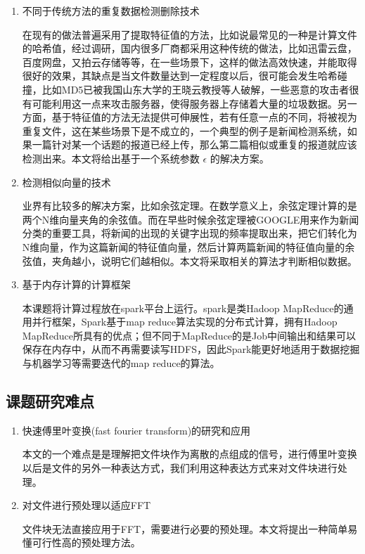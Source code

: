 \begin{enumerate}
\item 不同于传统方法的重复数据检测删除技术

在现有的做法普遍采用了提取特征值的方法，比如说最常见的一种是计算文件的哈希值，经过调研，国内很多厂商都采用这种传统的做法，比如迅雷云盘，百度网盘，又拍云存储等等，在一些场景下，这样的做法高效快速，并能取得很好的效果，其缺点是当文件数量达到一定程度以后，很可能会发生哈希碰撞，比如MD5已被我国山东大学的王晓云教授等人破解，一些恶意的攻击者很有可能利用这一点来攻击服务器，使得服务器上存储着大量的垃圾数据。另一方面，基于特征值的方法无法提供可伸展性，若有任意一点的不同，将被视为重复文件，这在某些场景下是不成立的，一个典型的例子是新闻检测系统，如果一篇针对某一个话题的报道已经上传，那么第二篇相似或重复的报道就应该检测出来。本文将给出基于一个系统参数 $\epsilon$ 的解决方案。

\item 检测相似向量的技术

业界有比较多的解决方案，比如余弦定理。在数学意义上，余弦定理计算的是两个N维向量夹角的余弦值。而在早些时候余弦定理被GOOGLE用来作为新闻分类的重要工具，将新闻的出现的关键字出现的频率提取出来，把它们转化为N维向量，作为这篇新闻的特征值向量，然后计算两篇新闻的特征值向量的余弦值，夹角越小，说明它们越相似。本文将采取相关的算法才判断相似数据。

\item 基于内存计算的计算框架

本课题将计算过程放在spark平台上运行。spark是类Hadoop MapReduce的通用并行框架，Spark基于map reduce算法实现的分布式计算，拥有Hadoop MapReduce所具有的优点；但不同于MapReduce的是Job中间输出和结果可以保存在内存中，从而不再需要读写HDFS，因此Spark能更好地适用于数据挖掘与机器学习等需要迭代的map reduce的算法。

\end{enumerate}

\subsection{课题研究难点}
\label{sec:point2}

\begin{enumerate}
\item 快速傅里叶变换(fast fourier transform)的研究和应用

本文的一个难点是是理解把文件块作为离散的点组成的信号，进行傅里叶变换以后是文件的另外一种表达方式，我们利用这种表达方式来对文件块进行处理。

\item 对文件进行预处理以适应FFT

文件块无法直接应用于FFT，需要进行必要的预处理。本文将提出一种简单易懂可行性高的预处理方法。
\end{enumerate}


